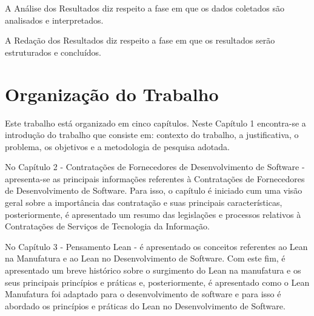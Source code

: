 A Análise dos Resultados diz respeito a fase em que os dados coletados são analisados e interpretados.

A Redação dos Resultados diz respeito a fase em que os resultados serão estruturados e concluídos.

\section[Organização do Trabalho]{Organização do Trabalho}

Este trabalho está organizado em cinco capítulos. Neste Capítulo 1 encontra-se a introdução do trabalho que consiste em: contexto do trabalho, a justificativa,  o problema, os objetivos e a metodologia de pesquisa adotada.

No Capítulo 2 - Contratações de Fornecedores de Desenvolvimento de Software - apresenta-se as principais informações referentes à Contratações de Fornecedores de Desenvolvimento de Software. Para isso, o capítulo é iniciado cum uma visão geral sobre a importância das contratação e suas principais características, posteriormente, é apresentado um resumo das legislações e processos relativos à Contratações de Serviços de Tecnologia da Informação.

No Capítulo 3 - Pensamento Lean - é apresentado os conceitos referentes ao Lean na Manufatura e ao Lean no Desenvolvimento de Software. Com este fim, é apresentado um breve histórico sobre o surgimento do Lean na manufatura e os seus principais princípios e práticas e, posteriormente, é apresentado como o Lean Manufatura foi adaptado para o desenvolvimento de software e para isso é abordado os princípios e práticas do Lean no Desenvolvimento de Software.
